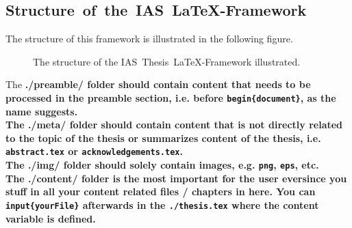 	\subsection{Structure~of~the~IAS~\LaTeX-Framework}
		The structure of this framework is illustrated in the following figure. %
		\begin{figure}[H]
			\centering
			\label{fig:structure}
			\caption{The structure of the IAS~Thesis~\LaTeX-Framework illustrated.}
		\end{figure}
		The \bf{./preamble/} folder should contain content that needs to be processed in the preamble section, i.e. before \texttt{\bs{}begin\{document\}}, as the name suggests. %
		\\[0.2cm]%
		The \bf{./meta/} folder should contain content that is not directly related to the topic of the thesis or summarizes content of the thesis, i.e. \texttt{abstract.tex} or \texttt{acknowledgements.tex}. %
		\\[0.2cm]%
		The \bf{./img/} folder should solely contain images, e.g. \texttt{png}, \texttt{eps}, etc. %
		\\[0.2cm]%
		The \bf{./content/} folder is the most important for the user eversince you stuff in all your content related files / chapters in here. %
		You can \texttt{\bs{}input\{yourFile\}} afterwards in the \texttt{./thesis.tex} where the content variable is defined. %

